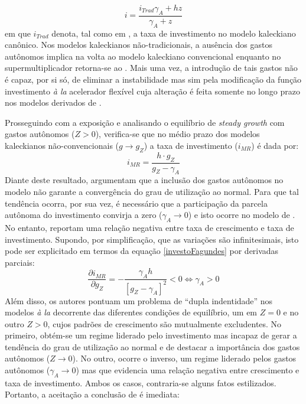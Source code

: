 $$
i = \frac{i_{Trad}\gamma_A + hz}{\gamma_A + z}
$$
em que $i_{Trad}$ denota, tal como em \textcite{fagundes_role_2017}, a taxa de investimento no modelo kaleckiano canônico. Nos modelos kaleckianos não-tradicionais, a ausência dos gastos autônomos implica na volta ao modelo kaleckiano convencional enquanto no supermultiplicador retorna-se ao \textcite{harrod_essay_1939}. Mais uma vez, a introdução de tais gastos não é capaz, por si só, de eliminar a instabilidade  mas sim pela modificação da função investimento \textit{à la} acelerador flexível cuja alteração é feita somente no longo prazo nos modelos derivados de \textcite{allain_tackling_2015}. 

Prosseguindo com a exposição e analisando o equilíbrio de \textit{steady growth} com gastos autônomos ($Z > 0$), verifica-se que no médio prazo dos modelos kaleckianos não-convencionais ($g\to g_Z$) a taxa de investimento ($i_{MR}$) é dada por:
\begin{equation}
\label{investoFagundes}
i_{MR} = \frac{h\cdot g_Z}{g_Z - \gamma_A}
\end{equation}
Diante deste resultado, \textcite{fagundes_role_2017} argumentam que a inclusão dos gastos autônomos no modelo não garante a convergência do grau de utilização ao normal. Para que tal tendência ocorra, por sua vez, é necessário que a participação da parcela autônoma do investimento convirja a zero ($\gamma_A \to 0$) e isto ocorre no modelo de \textcite{allain_tackling_2015}. 
No entanto, \textcite{fagundes_role_2017} reportam uma relação negativa entre taxa de crescimento e taxa de investimento. Supondo, por simplificação, que as variações são infinitesimais, isto pode ser explicitado em termos da equação \ref{investoFagundes} por derivadas parciais:
$$
\frac{\partial i_{MR}}{\partial g_Z} = - \frac{\gamma_A h}{[g_Z - \gamma_A]^2} < 0 \Leftrightarrow \gamma_A > 0
$$
Além disso, os autores pontuam um problema de ``dupla indentidade'' nos modelos \textit{à la} \textcite{allain_tackling_2015} decorrente das diferentes condições de equilíbrio, um em $Z = 0$ e no outro $Z>0$, cujos padrões de crescimento são mutualmente excludentes. No primeiro, obtém-se um regime liderado pelo investimento mas incapaz de gerar a tendência do grau de utilização ao normal e de destacar a importância dos gastos autônomos ($Z\to 0$). No outro, ocorre o inverso, um regime liderado pelos gastos autônomos ($\gamma_A \to 0$) mas que evidencia uma relação negativa entre crescimento e taxa de investimento. Ambos os casos, contraria-se alguns fatos estilizados. Portanto, a aceitação a conclusão de \textcite[p.~13]{fagundes_role_2017} é imediata:

